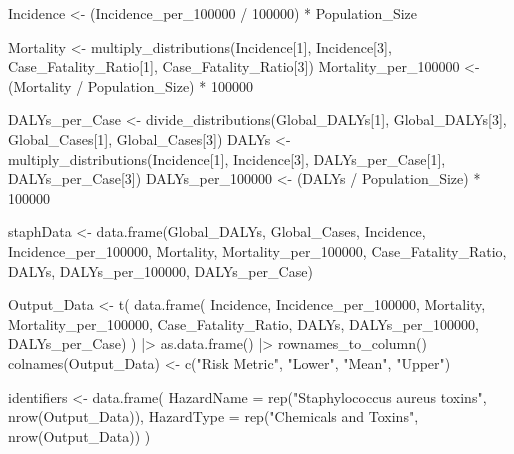 \documentclass[
  letterpaper,
  DIV=11,
  numbers=noendperiod]{scrartcl}
\newenvironment{Shaded}{\begin{snugshade}}{\end{snugshade}}
\newcommand{\AttributeTok}[1]{\textcolor[rgb]{0.40,0.45,0.13}{#1}}
\newcommand{\DecValTok}[1]{\textcolor[rgb]{0.68,0.00,0.00}{#1}}
\newcommand{\FunctionTok}[1]{\textcolor[rgb]{0.28,0.35,0.67}{#1}}
\newcommand{\NormalTok}[1]{\textcolor[rgb]{0.00,0.23,0.31}{#1}}
\newcommand{\OtherTok}[1]{\textcolor[rgb]{0.00,0.23,0.31}{#1}}
\newcommand{\SpecialCharTok}[1]{\textcolor[rgb]{0.37,0.37,0.37}{#1}}
\newcommand{\StringTok}[1]{\textcolor[rgb]{0.13,0.47,0.30}{#1}}
\begin{document}
\begin{Shaded}
\begin{Highlighting}[]
\NormalTok{Incidence }\OtherTok{\textless{}{-}}\NormalTok{ (Incidence\_per\_100000 }\SpecialCharTok{/} \DecValTok{100000}\NormalTok{) }\SpecialCharTok{*}\NormalTok{ Population\_Size}

\NormalTok{Mortality }\OtherTok{\textless{}{-}} \FunctionTok{multiply\_distributions}\NormalTok{(Incidence[}\DecValTok{1}\NormalTok{], Incidence[}\DecValTok{3}\NormalTok{],  Case\_Fatality\_Ratio[}\DecValTok{1}\NormalTok{],  Case\_Fatality\_Ratio[}\DecValTok{3}\NormalTok{])}
\NormalTok{Mortality\_per\_100000 }\OtherTok{\textless{}{-}}\NormalTok{ (Mortality }\SpecialCharTok{/}\NormalTok{ Population\_Size) }\SpecialCharTok{*} \DecValTok{100000}

\NormalTok{DALYs\_per\_Case }\OtherTok{\textless{}{-}} \FunctionTok{divide\_distributions}\NormalTok{(Global\_DALYs[}\DecValTok{1}\NormalTok{], Global\_DALYs[}\DecValTok{3}\NormalTok{],  Global\_Cases[}\DecValTok{1}\NormalTok{], Global\_Cases[}\DecValTok{3}\NormalTok{])}
\NormalTok{DALYs }\OtherTok{\textless{}{-}} \FunctionTok{multiply\_distributions}\NormalTok{(Incidence[}\DecValTok{1}\NormalTok{], Incidence[}\DecValTok{3}\NormalTok{],  DALYs\_per\_Case[}\DecValTok{1}\NormalTok{],  DALYs\_per\_Case[}\DecValTok{3}\NormalTok{])}
\NormalTok{DALYs\_per\_100000 }\OtherTok{\textless{}{-}}\NormalTok{ (DALYs }\SpecialCharTok{/}\NormalTok{ Population\_Size) }\SpecialCharTok{*} \DecValTok{100000}

\NormalTok{staphData }\OtherTok{\textless{}{-}} \FunctionTok{data.frame}\NormalTok{(Global\_DALYs,  Global\_Cases,  Incidence,  Incidence\_per\_100000,  Mortality,  Mortality\_per\_100000,  Case\_Fatality\_Ratio,  DALYs,  DALYs\_per\_100000,  DALYs\_per\_Case)}

\NormalTok{Output\_Data }\OtherTok{\textless{}{-}} \FunctionTok{t}\NormalTok{(}
 \FunctionTok{data.frame}\NormalTok{(}
\NormalTok{ Incidence,  Incidence\_per\_100000, }
\NormalTok{ Mortality,  Mortality\_per\_100000, }
\NormalTok{ Case\_Fatality\_Ratio, }
\NormalTok{ DALYs,  DALYs\_per\_100000,  DALYs\_per\_Case)}
\NormalTok{ ) }\SpecialCharTok{|\textgreater{}} 
 \FunctionTok{as.data.frame}\NormalTok{() }\SpecialCharTok{|\textgreater{}} 
 \FunctionTok{rownames\_to\_column}\NormalTok{()}
\FunctionTok{colnames}\NormalTok{(Output\_Data) }\OtherTok{\textless{}{-}} \FunctionTok{c}\NormalTok{(}\StringTok{"Risk Metric"}\NormalTok{,  }\StringTok{"Lower"}\NormalTok{,  }\StringTok{"Mean"}\NormalTok{,  }\StringTok{"Upper"}\NormalTok{)}

\NormalTok{identifiers }\OtherTok{\textless{}{-}} \FunctionTok{data.frame}\NormalTok{(}
 \AttributeTok{HazardName =} \FunctionTok{rep}\NormalTok{(}\StringTok{"Staphylococcus aureus toxins"}\NormalTok{,  }\FunctionTok{nrow}\NormalTok{(Output\_Data)), }
 \AttributeTok{HazardType =} \FunctionTok{rep}\NormalTok{(}\StringTok{"Chemicals and Toxins"}\NormalTok{,  }\FunctionTok{nrow}\NormalTok{(Output\_Data))}
\NormalTok{ )}
         


\end{Highlighting}
\end{Shaded}
\end{document}
